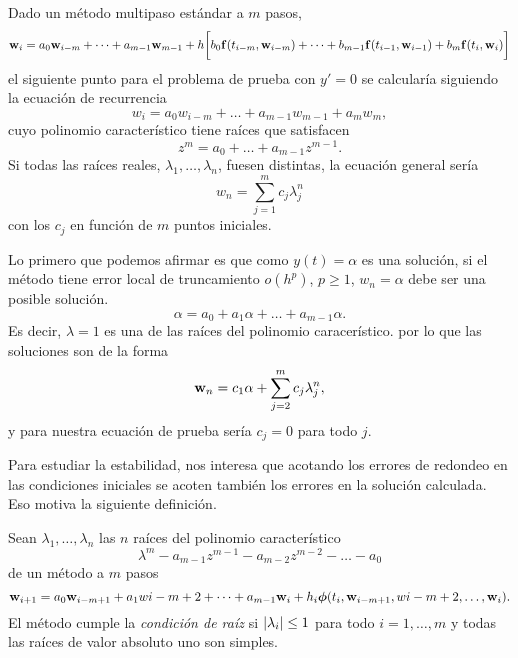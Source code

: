 Dado un método multipaso estándar a $m$ pasos,
\begin{equation*}
    \vb{w}{}_i = a_0\vb{w}{}_{i-m} + \dots + a_{m-1}\vb{w}{}_{m-1} + h\qty\bigg[
        b_0\vb{f}{}(t_{i-m}, \vb{w}{}_{i-m}) + \dots + b_{m-1}\vb{f}{}(t_{i-1}, \vb{w}{}_{i-1})
        + b_m\vb{f}{}(t_i, \vb{w}{}_i)
    ]
\end{equation*}
el siguiente punto para el problema de prueba con $y' = 0$ se calcularía
siguiendo la ecuación de recurrencia
\begin{equation*}
    w_i = a_0w_{i-m} + \dots + a_{m-1}w_{m-1} + a_mw_m,
\end{equation*}
cuyo polinomio característico tiene raíces que satisfacen
\begin{equation*}
    z^m = a_0 + \dots + a_{m-1}z^{m-1}.
\end{equation*}
Si todas las raíces reales, $\lambda_1,\dots,\lambda_n$, fuesen distintas,
la ecuación general sería
\begin{equation*}
    w_n = \sum_{j=1}^m c_j\lambda_j^n
\end{equation*}
con los $c_j$ en función de $m$ puntos iniciales.

Lo primero que podemos afirmar es que como $y(t) = \alpha$ es una solución,
si el método tiene error local de truncamiento $o(h^p)$, $p \ge 1$,
$w_n = \alpha$ debe ser una posible solución.
\begin{equation*}
    \alpha = a_0 + a_1\alpha + \dots + a_{m-1}\alpha.
\end{equation*}
Es decir, $\lambda = 1$ es una de las raíces del polinomio caracerístico.
por lo que las soluciones son de la forma
\begin{equation*}
    \vb{w}{}_n = c_1\alpha + \sum_{j=2}^m c_j\lambda_j^n,
\end{equation*}
y para nuestra ecuación de prueba sería $c_j = 0$ para todo $j$.

Para estudiar la estabilidad,
nos interesa que acotando los errores de redondeo en las condiciones iniciales
se acoten también los errores en la solución calculada.
Eso motiva la siguiente definición.

\begin{definition}
    Sean $\lambda_1,\ldots,\lambda_n$ las $n$ raíces del
    polinomio característico
    \begin{equation*}
        \lambda^m - a_{m-1}z^{m-1} - a_{m-2}z^{m-2} - \dots - a_0
    \end{equation*}
    de un método a $m$ pasos
    \begin{equation}\label{eqn:multistep}
        \vb{w}{}_{i+1} = a_0\vb{w}{}_{i-m+1} + a_1w{i-m+2} + \dots + a_{m-1}\vb{w}{}_i
            + h_i\vb*{\phi}{}(t_i,\vb{w}{}_{i-m+1},w{i-m+2},\dots,\vb{w}{}_i).
    \end{equation}
    El método cumple la \emph{condición de raíz} si
    $\abs{\lambda_i} \le 1$ para todo $i = 1,\ldots, m$
    y todas las raíces de valor absoluto uno son simples.
\end{definition}

